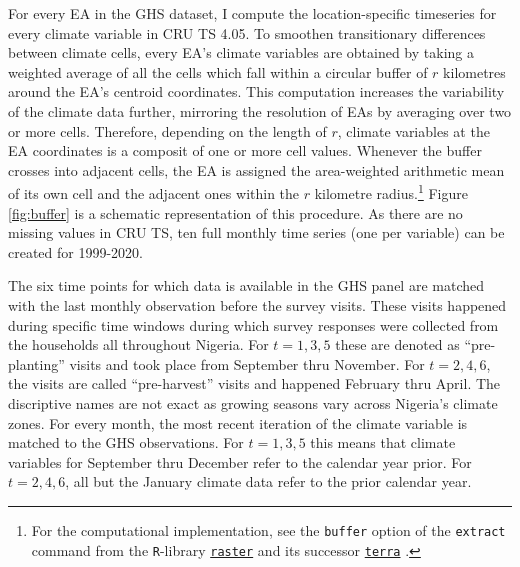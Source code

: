 \documentclass[a4paper,12pt]{article}
\theoremstyle{plain}
\theoremstyle{definition}
\theoremstyle{definition}
\theoremstyle{definition}
\theoremstyle{definition}
\begin{document}
For every EA in the GHS dataset, I compute the location-specific timeseries for every climate variable in CRU TS 4.05. To smoothen transitionary differences between climate cells, every EA's climate variables are obtained by taking a weighted average of all the cells which fall within a circular buffer of $r$ kilometres around the EA's centroid coordinates. This computation increases the variability of the climate data further, mirroring the resolution of EAs by averaging over two or more cells. Therefore, depending on the length of $r$, climate variables at the EA coordinates is a composit of one or more cell values. Whenever the buffer crosses into adjacent cells, the EA is assigned the area-weighted arithmetic mean of its own cell and the adjacent ones within the $r$ kilometre radius.\footnote{For the computational implementation, see the \texttt{buffer} option of the \texttt{extract} command from the \texttt{R}-library \href{https://cran.r-project.org/web/packages/raster}{\texttt{raster}} \citep{hijmans2020} and its successor \href{https://cran.r-project.org/web/packages/terra}{\texttt{terra}} \citep{hijmans2021}.} Figure \ref{fig:buffer} is a schematic representation of this procedure. As there are no missing values in CRU TS, ten full monthly time series (one per variable) can be created for 1999-2020.

The six time points for which data is available in the GHS panel are matched with the last monthly observation before the survey visits. These visits happened during specific time windows during which survey responses were collected from the households all throughout Nigeria. For $t = 1,3,5$ these are denoted as ``pre-planting'' visits and took place from September thru November. For $t = 2,4,6$, the visits are called ``pre-harvest'' visits and happened February thru April. The discriptive names are not exact as growing seasons vary across Nigeria's climate zones. For every month, the most recent iteration of the climate variable is matched to the GHS observations. For $t=1,3,5$ this means that climate variables for September thru December refer to the calendar year prior. For $t=2,4,6$, all but the January climate data refer to the prior calendar year. 
\end{document}
